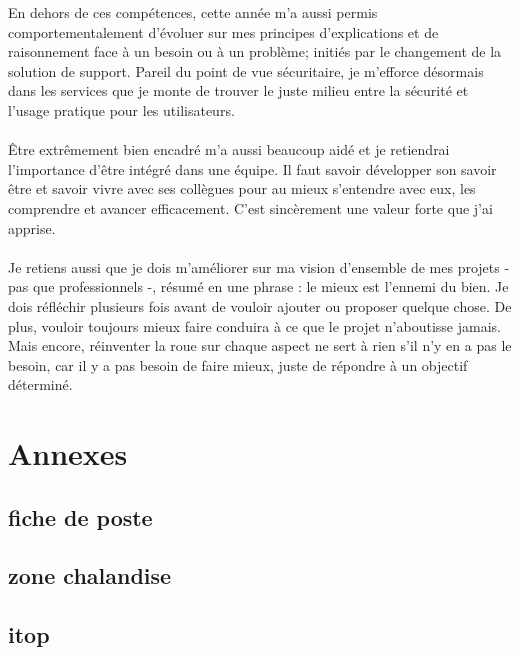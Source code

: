 \begin{sloppypar}
En dehors de ces compétences, cette année m'a aussi permis comportementalement d'évoluer sur mes principes d'explications et de raisonnement face à un besoin ou à un problème; initiés par le changement de la solution de support. Pareil du point de vue sécuritaire, je m'efforce désormais dans les services que je monte de trouver le juste milieu entre la sécurité et l'usage pratique pour les utilisateurs.
\\ \\
Être extrêmement bien encadré m'a aussi beaucoup aidé et je retiendrai l'importance d'être intégré dans une équipe. Il faut savoir développer son savoir être et savoir vivre avec ses collègues pour au mieux s'entendre avec eux, les comprendre et avancer efficacement. C'est sincèrement une valeur forte que j'ai apprise.
\\ \\
Je retiens aussi que je dois m'améliorer sur ma vision d'ensemble de mes projets - pas que professionnels -, résumé en une phrase : le mieux est l'ennemi du bien. Je dois réfléchir plusieurs fois avant de vouloir ajouter ou proposer quelque chose. De plus, vouloir toujours mieux faire conduira à ce que le projet n'aboutisse jamais. Mais encore, réinventer la roue sur chaque aspect ne sert à rien s'il n'y en a pas le besoin, car il y a pas besoin de faire mieux, juste de répondre à un objectif déterminé.

\newpage

\printbibliography %

\newpage
\label{glossaire}

\glsaddallunused
\printglossary[type=\acronymtype, title={Liste des abréviations}]
\printglossary[title={Glossaire}]

\newpage
\appendix

\section{Annexes}
\label{ddrs}
\subsection{fiche de poste}
\subsection{zone chalandise}
\subsection{itop}

\end{sloppypar}



